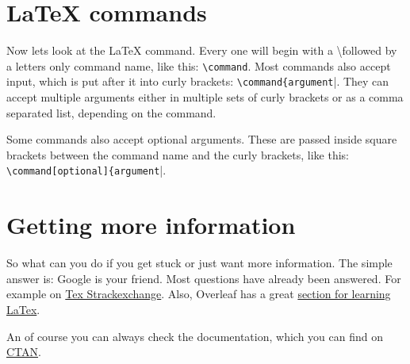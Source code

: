     \section{LaTeX commands}
        Now lets look at the LaTeX command. Every one will begin with a \textbackslash\space followed by a letters only command name, like this:
        \verb|\command|. Most commands also accept input, which is put after it into curly brackets: \verb|\command{argument||. They can
        accept multiple arguments either in multiple sets of curly brackets or as a comma separated list, depending on the command.

        Some commands also accept optional arguments. These are passed inside square brackets between the command name and the curly brackets, like
        this: \verb|\command[optional]{argument||.

    \section{Getting more information}
        So what can you do if you get stuck or just want more information. The simple answer is: Google is your friend. Most questions have already
        been answered. For example on \href{https://tex.stackexchange.com/}{Tex Strackexchange}. Also, Overleaf has a great
        \href{https://www.overleaf.com/learn}{section for learning LaTex}.

        An of course you can always check the documentation, which you can find on \href{https://ctan.org/}{CTAN}.
